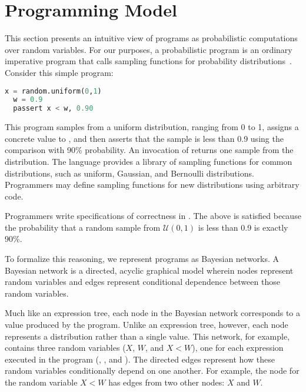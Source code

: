 \section{Programming Model}
\label{sec:model}
 
This section presents an intuitive view of programs as probabilistic
computations over random variables.
For our purposes, a probabilistic program is an ordinary imperative program
that calls sampling functions for probability distributions~\cite{kozen}.
Consider this simple program:
%
\begin{lstlisting}[language=Python]
  x = random.uniform(0,1)
  w = 0.9
  passert x < w, 0.90
\end{lstlisting}
%
This program samples from a uniform distribution, ranging from 0 to 1,
assigns a concrete value to , and then asserts that the sample is
less than 0.9 using the comparison  with 90\% probability.
An invocation
of  returns one sample from the distribution.
The language provides a library of sampling functions for common distributions, such as uniform, Gaussian,
and Bernoulli distributions. Programmers may define sampling functions for new distributions using
arbitrary code.

Programmers write specifications of correctness in \passerts. The above \passert is
satisfied because the probability that a random sample from 
$\mathcal{U}(0,1)$ is less than 0.9 is exactly 90\%.

To formalize this reasoning, we represent programs as Bayesian networks.
A Bayesian network is
a directed, acyclic graphical model wherein nodes represent random variables and
edges represent conditional dependence between those
random variables.
%
\begin{center}
{\scriptsize
{}
}
\end{center}
%
Much like an expression tree, each node in the Bayesian network corresponds to a value produced by the program.  Unlike an expression tree, however, each node represents a distribution rather than a single value.
This network, for example,
contains three random variables ($X$, $W$, and $X<W$), one for each
expression executed in the program (, ,
and ). The directed edges represent how these
random variables conditionally depend on one another. For example,
the node for the random variable $X
< W$ has edges from two other nodes: $X$ and $W$.

